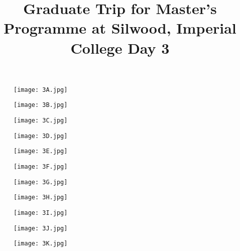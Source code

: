 \documentclass[11pt]{article}
\title{Graduate Trip for Master's Programme at Silwood, Imperial College \newline Day 3}
\begin{document}
  \maketitle
  
  \newpage

  \linenumbers

\begin{figure}[H]
    \centering
    \texttt{[image: 3A.jpg]}
\end{figure}

\begin{figure}[H]
    \centering
    \texttt{[image: 3B.jpg]}
\end{figure}

\begin{figure}[H]
    \centering
    \texttt{[image: 3C.jpg]}
\end{figure}

\begin{figure}[H]
    \centering
    \texttt{[image: 3D.jpg]}
\end{figure}

\begin{figure}[H]
    \centering
    \texttt{[image: 3E.jpg]}
\end{figure}

\begin{figure}[H]
    \centering
    \texttt{[image: 3F.jpg]}
\end{figure}

\begin{figure}[H]
    \centering
    \texttt{[image: 3G.jpg]}
\end{figure}

\begin{figure}[H]
    \centering
    \texttt{[image: 3H.jpg]}
\end{figure}

\begin{figure}[H]
    \centering
    \texttt{[image: 3I.jpg]}
\end{figure}

\begin{figure}[H]
    \centering
    \texttt{[image: 3J.jpg]}
\end{figure}

\begin{figure}[H]
    \centering
    \texttt{[image: 3K.jpg]}
\end{figure}
\end{document}
